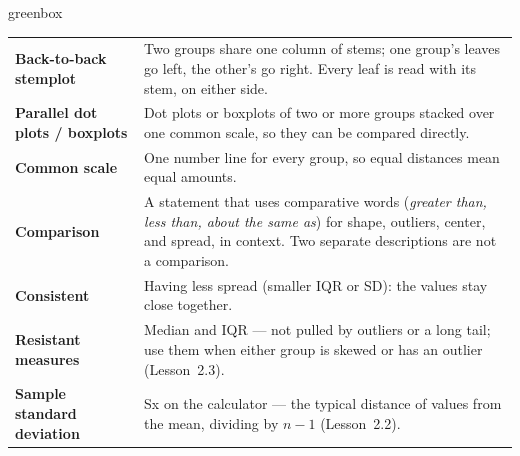 \documentclass[10pt]{article}
\begin{document}
\boxguard[24]
\begin{skillbox}{greenbox}
\small
\renewcommand{\arraystretch}{1.35}
\begin{tabularx}{\linewidth}{@{} >{\bfseries}p{3.4cm} X @{}}
Back-to-back stemplot & Two groups share one column of stems; one group's leaves go left, the
       other's go right. Every leaf is read with its stem, on either side. \\
Parallel dot plots / boxplots & Dot plots or boxplots of two or more groups stacked over one
       common scale, so they can be compared directly. \\
Common scale & One number line for every group, so equal distances mean equal amounts. \\
Comparison & A statement that uses comparative words (\emph{greater than, less than, about the
       same as}) for shape, outliers, center, and spread, in context. Two separate
       descriptions are not a comparison. \\
Consistent & Having less spread (smaller IQR or SD): the values stay close together. \\
Resistant measures & Median and IQR --- not pulled by outliers or a long tail; use them when
       either group is skewed or has an outlier (Lesson~2.3). \\
Sample standard deviation & Sx on the calculator --- the typical distance of values from the
       mean, dividing by $n-1$ (Lesson~2.2). \\
\end{tabularx}
\end{skillbox}
\end{document}
